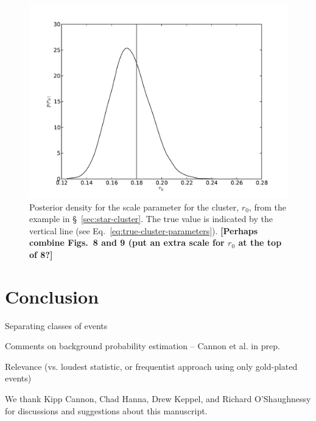 \documentclass[aps,prd]{revtex4-1}
\newcommand{\ilya}[1]{{\color{red} \bf #1}}
\begin{document}
\begin{figure}
  \includegraphics[width=\columnwidth]{scale}
  \caption{\label{fig:cluster-scale} Posterior density for the scale
    parameter for the cluster, $r_0$, from the example in
    \S~\ref{sec:star-cluster}.  The true value is indicated by the
    vertical line (see Eq.~\ref{eq:true-cluster-parameters}).
    \ilya{[Perhaps combine Figs.~8 and 9 (put an extra scale for $r_0$
        at the top of 8?]} }
\end{figure}

\section{Conclusion}

Separating classes of events

Comments on background probability estimation --  Cannon et al. in prep.

Relevance (vs. loudest statistic, or frequentist approach using only
gold-plated events)

\begin{acknowledgments}
  We thank Kipp Cannon, Chad Hanna, Drew Keppel, and Richard
  O'Shaughnessy for discussions and suggestions about this manuscript.
\end{acknowledgments}



\end{document}

